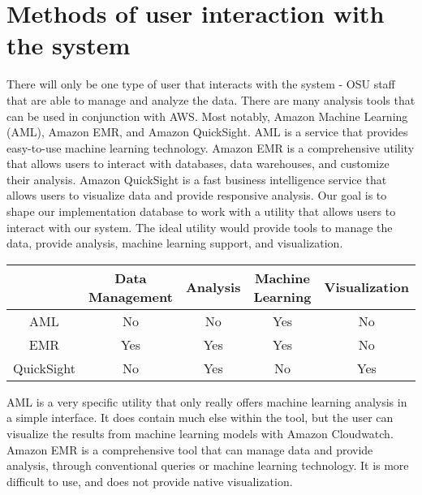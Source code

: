         \section{Methods of user interaction with the system}
        There will only be one type of user that interacts with the system - OSU staff that are able to manage and analyze the data. There are many analysis tools that can be used in conjunction with AWS. Most notably, Amazon Machine Learning (AML), Amazon EMR, and Amazon QuickSight. AML is a service that provides easy-to-use machine learning technology. Amazon EMR is a comprehensive utility that allows users to interact with databases, data warehouses, and customize their analysis. Amazon QuickSight is a fast business intelligence service that allows users to visualize data and provide responsive analysis. Our goal is to shape our implementation database to work with a utility that allows users to interact with our system. The ideal utility would provide tools to manage the data, provide analysis, machine learning support, and visualization.

        \begin{table}[ht]
        \centering
        \begin{tabular}{|c|c|c|c|c|}
            \hline
            \textbf{} & \textbf{Data Management} & \textbf{Analysis} & \textbf{Machine Learning} & \textbf{Visualization}\\
            \hline
            AML & No & No & Yes & No\\
            \hline
            EMR & Yes & Yes & Yes & No\\
            \hline
            QuickSight & No & Yes & No & Yes\\
            \hline
        \end{tabular}
        \end{table}

        \noindent AML is a very specific utility that only really offers machine learning analysis in a simple interface. It does contain much else within the tool, but the user can visualize the results from machine learning models with Amazon Cloudwatch.\\ 
        
        \noindent Amazon EMR is a comprehensive tool that can manage data and provide analysis, through conventional queries or machine learning technology. It is more difficult to use, and does not provide native visualization.\\ 

